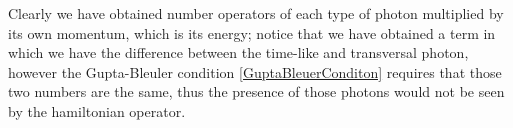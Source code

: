 Clearly we have obtained number operators of each type of photon multiplied by its own momentum, which is its energy; notice that we have obtained a term in which we have the difference between the time-like and transversal photon, however the Gupta-Bleuler condition \eqref{GuptaBleuerConditon} requires that those two numbers are the same, thus the presence of those photons would not be seen by the hamiltonian operator.